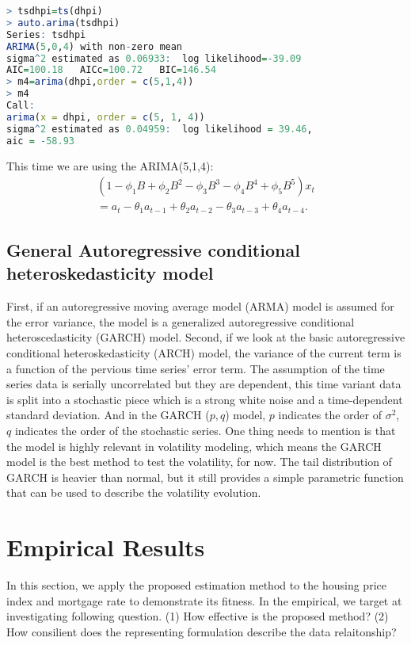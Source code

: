 \documentclass[12pt,letterpaper]{article}
\begin{document}
{\footnotesize
\begin{lstlisting}[language=R]
> tsdhpi=ts(dhpi)
> auto.arima(tsdhpi)
Series: tsdhpi 
ARIMA(5,0,4) with non-zero mean 
sigma^2 estimated as 0.06933:  log likelihood=-39.09
AIC=100.18   AICc=100.72   BIC=146.54
> m4=arima(dhpi,order = c(5,1,4))
> m4
Call:
arima(x = dhpi, order = c(5, 1, 4))
sigma^2 estimated as 0.04959:  log likelihood = 39.46,  
aic = -58.93
\end{lstlisting}
}

This time we are using the ARIMA(5,1,4):
\begin{equation}
\begin{aligned}
(1-\phi_1B+\phi_2B^2-\phi_3B^3-\phi_4B^4+\phi_5B^5)x_t \\
= a_t -\theta_1 a_{t-1}+\theta_2a_{t-2}-\theta_3a_{t-3}+\theta_4a_{t-4}.
\end{aligned}
\end{equation}

\subsection{General Autoregressive conditional heteroskedasticity model}
First, if an autoregressive moving average model (ARMA) model is assumed for the error variance, the model is a generalized autoregressive conditional heteroscedasticity (GARCH) model.
Second, if we look at the basic autoregressive conditional heteroskedasticity (ARCH) model, the variance of the current term is a function of the pervious time series' error term. 
The assumption of the time series data is serially uncorrelated but they are dependent, this time variant data is split into a stochastic piece which is a strong white noise and a time-dependent standard deviation.
And in the GARCH ($p,q$) model, $p$ indicates the order of $\sigma^2$, $q$ indicates the order of the stochastic series.
One thing needs to mention is that the model is highly relevant in volatility modeling, which means the GARCH model is the best method to test the volatility, for now.
The tail distribution of GARCH is heavier than normal, but it still provides a simple parametric function that can be used to describe the volatility evolution. 


\section{Empirical Results}
In this section, we apply the proposed estimation method to the housing price index and mortgage rate to demonstrate its fitness. 
In the empirical, we target at investigating following question. 
(1) How effective is the proposed method? 
(2) How consilient does the representing formulation describe the data relaitonship? 
\end{document}
